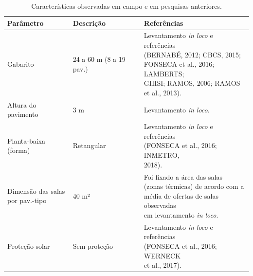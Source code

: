 \begin{table}[ht]\centering
    \caption{\small Características observadas em campo e em pesquisas anteriores.}
    \vspace*{0.2cm}
    \label{tab:tabela4}
    \begin{tabular*}{\columnwidth}{@{\extracolsep{\fill}}lll}
    \hline
    \textbf{Parâmetro}                                             & \textbf{Descrição}                                                                    & \textbf{Referências} \\ \hline
    Gabarito                                                       & 24 a 60 m (8 a 19 pav.)                                                               & \makecell[l]{Levantamento \textit{in loco} e referências\\ (BERNABÉ, 2012; CBCS, 2015; \\FONSECA et al., 2016; LAMBERTS; \\GHISI; RAMOS, 2006; RAMOS \\et al., 2013).} \\ \hline
    Altura do pavimento                                            & 3 m                                                                                   & Levantamento \textit{in loco}.                                                                                                                                         \\ \hline
    Planta-baixa (forma)                                           & Retangular                                                                            & \makecell[l]{Levantamento \textit{in loco} e referências\\ (FONSECA et al., 2016; INMETRO,\\ 2018).}                                                                   \\ \hline
    \makecell[l]{Dimensão das salas\\ por pav.-tipo}               & 40 m²                                                                                 & \makecell[l]{Foi fixado a área das salas \\(zonas térmicas) de acordo com a \\média de ofertas de salas observadas\\ em levantamento \textit{in loco}.}                  \\ \hline
    Proteção solar                                                 & Sem proteção                                                                          & \makecell[l]{Levantamento \textit{in loco} e referências\\ (FONSECA et al., 2016; WERNECK \\et al., 2017).}                                                            \\ \hline

\end{tabular*}
\end{table}
